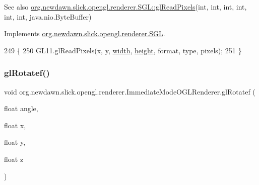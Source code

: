 \begin{DoxySeeAlso}{See also}
\mbox{\hyperlink{interfaceorg_1_1newdawn_1_1slick_1_1opengl_1_1renderer_1_1_s_g_l_a6a734843b3a3bb87604d439da37f4e74}{org.\+newdawn.\+slick.\+opengl.\+renderer.\+S\+G\+L\+::gl\+Read\+Pixels}}(int, int, int, int, int, int, java.\+nio.\+Byte\+Buffer) 
\end{DoxySeeAlso}


Implements \mbox{\hyperlink{interfaceorg_1_1newdawn_1_1slick_1_1opengl_1_1renderer_1_1_s_g_l_a6a734843b3a3bb87604d439da37f4e74}{org.\+newdawn.\+slick.\+opengl.\+renderer.\+S\+GL}}.


\begin{DoxyCode}
249                                                                                                            
      \{
250         GL11.glReadPixels(x, y, \mbox{\hyperlink{classorg_1_1newdawn_1_1slick_1_1opengl_1_1renderer_1_1_immediate_mode_o_g_l_renderer_a65d0a04d747368ea954f69074d9102d6}{width}}, \mbox{\hyperlink{classorg_1_1newdawn_1_1slick_1_1opengl_1_1renderer_1_1_immediate_mode_o_g_l_renderer_aec68994a0ee3b7b478122af823c8a8d7}{height}}, format, type, pixels);
251     \}
\end{DoxyCode}
\mbox{\label{classorg_1_1newdawn_1_1slick_1_1opengl_1_1renderer_1_1_immediate_mode_o_g_l_renderer_a998aac166770b6e32bdd4ded87629701}} 
\subsubsection{\texorpdfstring{gl\+Rotatef()}{glRotatef()}}
{\footnotesize\ttfamily void org.\+newdawn.\+slick.\+opengl.\+renderer.\+Immediate\+Mode\+O\+G\+L\+Renderer.\+gl\+Rotatef (\begin{DoxyParamCaption}\item[{float}]{angle,  }\item[{float}]{x,  }\item[{float}]{y,  }\item[{float}]{z }\end{DoxyParamCaption})\hspace{0.3cm}{\ttfamily [inline]}}

